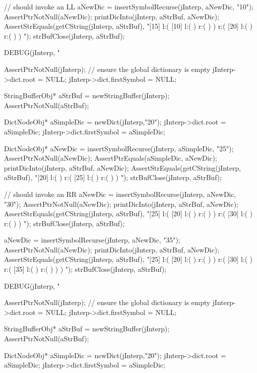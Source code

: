   // should invoke an LL
  aNewDic = insertSymbolRecurse(jInterp, aNewDic, "10");
  AssertPtrNotNull(aNewDic);
  printDicInto(jInterp, aStrBuf, aNewDic);
  AssertStrEquals(getCString(jInterp, aStrBuf),
  "[15] l:( [10] l:(  ) r:(  )  ) r:( [20] l:(  ) r:(  )  ) ");
  strBufClose(jInterp, aStrBuf);
\stopCTest
\stopTestCase

\startCTest
  DEBUG(jInterp, "\n%

  AssertPtrNotNull(jInterp);
  // ensure the global dictionary is empty
  jInterp->dict.root        = NULL;
  jInterp->dict.firstSymbol = NULL;

  StringBufferObj* aStrBuf = newStringBuffer(jInterp);
  AssertPtrNotNull(aStrBuf);
  
  DictNodeObj* aSimpleDic = newDict(jInterp,"20");
  jInterp->dict.root        = aSimpleDic;
  jInterp->dict.firstSymbol = aSimpleDic;

  DictNodeObj* aNewDic = insertSymbolRecurse(jInterp, aSimpleDic, "25");
  AssertPtrNotNull(aNewDic);
  AssertPtrEquals(aSimpleDic, aNewDic);
  printDicInto(jInterp, aStrBuf, aNewDic);
  AssertStrEquals(getCString(jInterp, aStrBuf),
  "[20] l:(  ) r:( [25] l:(  ) r:(  )  ) ");
  strBufClose(jInterp, aStrBuf);
  
  // should invoke an RR
  aNewDic = insertSymbolRecurse(jInterp, aNewDic, "30");
  AssertPtrNotNull(aNewDic);
  printDicInto(jInterp, aStrBuf, aNewDic);
  AssertStrEquals(getCString(jInterp, aStrBuf),
  "[25] l:( [20] l:(  ) r:(  )  ) r:( [30] l:(  ) r:(  )  ) ");
  strBufClose(jInterp, aStrBuf);
  
  aNewDic = insertSymbolRecurse(jInterp, aNewDic, "35");
  AssertPtrNotNull(aNewDic);
  printDicInto(jInterp, aStrBuf, aNewDic);
  AssertStrEquals(getCString(jInterp, aStrBuf),
  "[25] l:( [20] l:(  ) r:(  )  ) r:( [30] l:(  ) r:( [35] l:(  ) r:(  )  )  ) ");
  strBufClose(jInterp, aStrBuf);
\stopCTest
\stopTestCase

\startCTest
  DEBUG(jInterp, "\n%

  AssertPtrNotNull(jInterp);
  // ensure the global dictionary is empty
  jInterp->dict.root        = NULL;
  jInterp->dict.firstSymbol = NULL;

  StringBufferObj* aStrBuf = newStringBuffer(jInterp);
  AssertPtrNotNull(aStrBuf);
  
  DictNodeObj* aSimpleDic = newDict(jInterp,"20");
  jInterp->dict.root        = aSimpleDic;
  jInterp->dict.firstSymbol = aSimpleDic;

